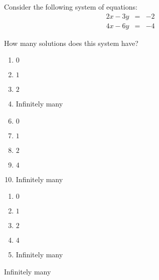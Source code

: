 


  Consider the following system of equations:
\[\begin{array}{lcl}
2x - 3y &=& -2\\
4x - 6y&=& -4
\end{array}
\]

How many solutions does this system have?


\ifsat
	\begin{enumerate}[label=\Alph*)]
		\item   $0$
		\item  $1$
		\item  $2$
		\item  Infinitely many%
	\end{enumerate}
\else
\fi

\ifacteven
	\begin{enumerate}[label=\textbf{\Alph*.},itemsep=\fill,align=left]
		\setcounter{enumii}{5}
		\item   $0$
		\item  $1$
		\item  $2$
		\addtocounter{enumii}{1}
		\item  $4$
		\item  Infinitely many%
	\end{enumerate}
\else
\fi

\ifactodd
	\begin{enumerate}[label=\textbf{\Alph*.},itemsep=\fill,align=left]
		\item   $0$
		\item  $1$
		\item  $2$
		\item  $4$
		\item  Infinitely many%
	\end{enumerate}
\else
\fi

\ifgridin
  Infinitely many%

\else
\fi

